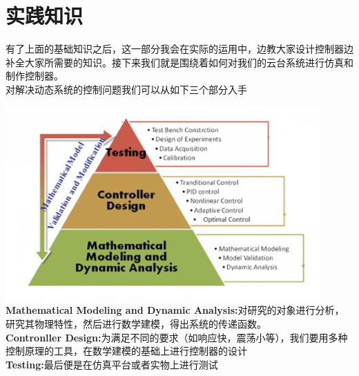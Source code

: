 \documentclass[UTF8,a4paper,12pt]{ctexart}
\begin{document}
  \section{实践知识}
    有了上面的基础知识之后，这一部分我会在实际的运用中，边教大家设计控制器边补全大家所需要的知识。接下来我们就是围绕着如何对我们的云台系统进行仿真和制作控制器。
  \\对解决动态系统的控制问题我们可以从如下三个部分入手
  \begin{notitlebox}
    \par \includegraphics[width=12cm]{picture/controller_pyramid.png}
    \textbf{Mathematical Modeling and Dynamic Analysis:}对研究的对象进行分析，研究其物理特性，然后进行数学建模，得出系统的传递函数。\\
    \textbf{Contronller Design:}为满足不同的要求（如响应快，震荡小等），我们要用多种控制原理的工具，在数学建模的基础上进行控制器的设计\\
    \textbf{Testing:}最后便是在仿真平台或者实物上进行测试
  \end{notitlebox}
\end{document}
